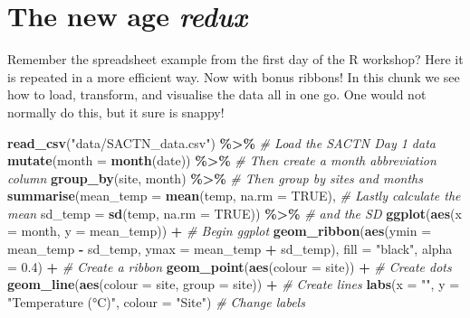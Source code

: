 \documentclass[
]{book}
\newenvironment{Shaded}{\begin{snugshade}}{\end{snugshade}}
\newcommand{\CommentTok}[1]{\textcolor[rgb]{0.56,0.35,0.01}{\textit{#1}}}
\newcommand{\DataTypeTok}[1]{\textcolor[rgb]{0.13,0.29,0.53}{#1}}
\newcommand{\FloatTok}[1]{\textcolor[rgb]{0.00,0.00,0.81}{#1}}
\newcommand{\KeywordTok}[1]{\textcolor[rgb]{0.13,0.29,0.53}{\textbf{#1}}}
\newcommand{\NormalTok}[1]{#1}
\newcommand{\OperatorTok}[1]{\textcolor[rgb]{0.81,0.36,0.00}{\textbf{#1}}}
\newcommand{\OtherTok}[1]{\textcolor[rgb]{0.56,0.35,0.01}{#1}}
\newcommand{\StringTok}[1]{\textcolor[rgb]{0.31,0.60,0.02}{#1}}
\begin{document}
\hypertarget{the-new-age-redux}{%
\section{\texorpdfstring{The new age \emph{redux}}{The new age redux}}\label{the-new-age-redux}}

Remember the spreadsheet example from the first day of the R workshop? Here it is repeated in a more efficient way. Now with bonus ribbons! In this chunk we see how to load, transform, and visualise the data all in one go. One would not normally do this, but it sure is snappy!

\begin{Shaded}
\begin{Highlighting}[]
\KeywordTok{read\_csv}\NormalTok{(}\StringTok{"data/SACTN\_data.csv"}\NormalTok{) }\OperatorTok{\%>\%}\StringTok{ }\CommentTok{\# Load the SACTN Day 1 data}
\StringTok{  }\KeywordTok{mutate}\NormalTok{(}\DataTypeTok{month =} \KeywordTok{month}\NormalTok{(date)) }\OperatorTok{\%>\%}\StringTok{ }\CommentTok{\# Then create a month abbreviation column}
\StringTok{  }\KeywordTok{group\_by}\NormalTok{(site, month) }\OperatorTok{\%>\%}\StringTok{ }\CommentTok{\# Then group by sites and months}
\StringTok{  }\KeywordTok{summarise}\NormalTok{(}\DataTypeTok{mean\_temp =} \KeywordTok{mean}\NormalTok{(temp, }\DataTypeTok{na.rm =} \OtherTok{TRUE}\NormalTok{), }\CommentTok{\# Lastly calculate the mean}
            \DataTypeTok{sd\_temp =} \KeywordTok{sd}\NormalTok{(temp, }\DataTypeTok{na.rm =} \OtherTok{TRUE}\NormalTok{)) }\OperatorTok{\%>\%}\StringTok{ }\CommentTok{\# and the SD}
\StringTok{  }\KeywordTok{ggplot}\NormalTok{(}\KeywordTok{aes}\NormalTok{(}\DataTypeTok{x =}\NormalTok{ month, }\DataTypeTok{y =}\NormalTok{ mean\_temp)) }\OperatorTok{+}\StringTok{ }\CommentTok{\# Begin ggplot}
\StringTok{  }\KeywordTok{geom\_ribbon}\NormalTok{(}\KeywordTok{aes}\NormalTok{(}\DataTypeTok{ymin =}\NormalTok{ mean\_temp }\OperatorTok{{-}}\StringTok{ }\NormalTok{sd\_temp, }\DataTypeTok{ymax =}\NormalTok{ mean\_temp }\OperatorTok{+}\StringTok{ }\NormalTok{sd\_temp), }
              \DataTypeTok{fill =} \StringTok{"black"}\NormalTok{, }\DataTypeTok{alpha =} \FloatTok{0.4}\NormalTok{) }\OperatorTok{+}\StringTok{ }\CommentTok{\# Create a ribbon}
\StringTok{  }\KeywordTok{geom\_point}\NormalTok{(}\KeywordTok{aes}\NormalTok{(}\DataTypeTok{colour =}\NormalTok{ site)) }\OperatorTok{+}\StringTok{ }\CommentTok{\# Create dots}
\StringTok{  }\KeywordTok{geom\_line}\NormalTok{(}\KeywordTok{aes}\NormalTok{(}\DataTypeTok{colour =}\NormalTok{ site, }\DataTypeTok{group =}\NormalTok{ site)) }\OperatorTok{+}\StringTok{ }\CommentTok{\# Create lines}
\StringTok{  }\KeywordTok{labs}\NormalTok{(}\DataTypeTok{x =} \StringTok{""}\NormalTok{, }\DataTypeTok{y =} \StringTok{"Temperature (°C)"}\NormalTok{, }\DataTypeTok{colour =} \StringTok{"Site"}\NormalTok{) }\CommentTok{\# Change labels}
\end{Highlighting}
\end{Shaded}
\end{document}
